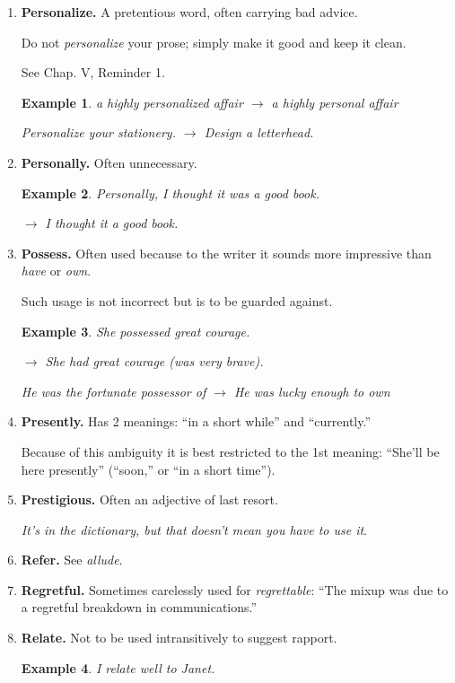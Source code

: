 \documentclass{article}
\newtheorem{example}{Example}
\begin{document}
\begin{enumerate}
	If of ``6 people'' 5 went away, how many people would be left?
	
	Answer: 1 people.
	\item {\bf Personalize.} A pretentious word, often carrying bad advice.
	
	Do not {\it personalize} your prose; simply make it good and keep it clean.
	
	See Chap. V, Reminder 1.
	\begin{example}
		a highly personalized affair $\to$ a highly personal affair
		
		Personalize your stationery. $\to$ Design a letterhead.
	\end{example}
	\item {\bf Personally.} Often unnecessary.
	\begin{example}
		Personally, I thought it was a good book.
		
		$\to$ I thought it a good book.
	\end{example}
	\item {\bf Possess.} Often used because to the writer it sounds more impressive than {\it have} or {\it own}.
	
	Such usage is not incorrect but is to be guarded against.
	\begin{example}
		She possessed great courage.
		
		$\to$ She had great courage (was very brave).
		
		He was the fortunate possessor of $\to$ He was lucky enough to own
	\end{example}
	\item {\bf Presently.} Has 2 meanings: ``in a short while'' and ``currently.''
	
	Because of this ambiguity it is best restricted to the 1st meaning: ``She'll be here presently'' (``soon,'' or ``in a short time'').
	\item {\bf Prestigious.} Often an adjective of last resort.
	
	{\it It's in the dictionary, but that doesn't mean you have to use it}.
	\item {\bf Refer.} See {\it allude}.
	\item {\bf Regretful.} Sometimes carelessly used for {\it regrettable}: ``The mixup was due to a regretful breakdown in communications.''
	\item {\bf Relate.} Not to be used intransitively to suggest rapport.
	\begin{example}
		I relate well to Janet.
		

\end{example}
\end{enumerate}
\end{document}
